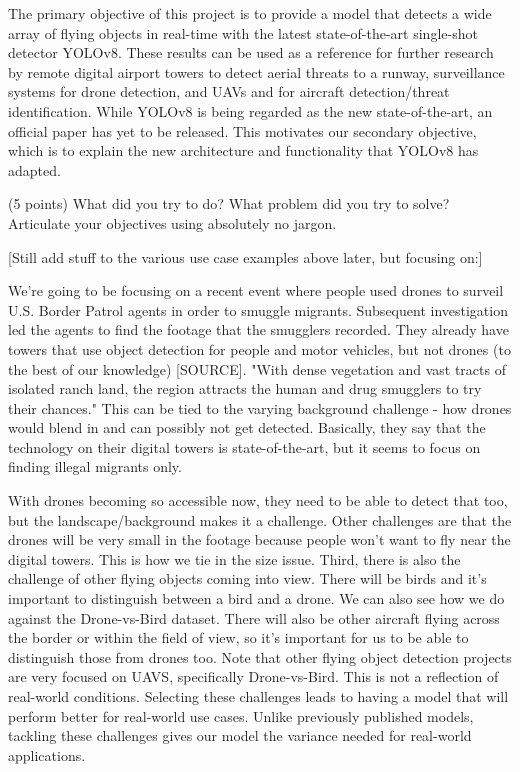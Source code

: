 \documentclass[10pt,twocolumn,letterpaper]{article}
\begin{document}
The primary objective of this project is to provide a model that detects a wide array of flying objects in real-time with the latest 
state-of-the-art single-shot detector YOLOv8. These results can be used as a reference for further research by remote digital airport 
towers to detect aerial threats to a runway, surveillance systems for drone detection, and UAVs and for aircraft detection/threat identification. 
While YOLOv8 is being regarded as the new state-of-the-art, an official paper has yet to be released. This motivates our secondary objective, 
which is to explain the new architecture and functionality that YOLOv8 has adapted.


(5 points) What did you try to do? What problem did you try to solve? Articulate your objectives using absolutely no jargon. 

[Still add stuff to the various use case examples above later, but focusing on:]
    
We're going to be focusing on a recent event where people used drones to surveil U.S. Border Patrol agents in order to smuggle migrants. Subsequent investigation led the agents to find the footage that the smugglers recorded. They already have towers that use object detection for people and motor vehicles, but not drones (to the best of our knowledge) [SOURCE]. "With dense vegetation and vast tracts of isolated ranch land, the region attracts the human and drug smugglers to try their chances." This can be tied to the varying background challenge - how drones would blend in and can possibly not get detected. Basically, they say that the technology on their digital towers is state-of-the-art, but it seems to focus on finding illegal migrants only. 

With drones becoming so accessible now, they need to be able to detect that too, but the landscape/background makes it a challenge. Other challenges are that the drones will be very small in the footage because people won't want to fly near the digital towers. This is how we tie in the size issue. Third, there is also the challenge of other flying objects coming into view. There will be birds and it's important to distinguish between a bird and a drone. We can also see how we do against the Drone-vs-Bird dataset. There will also be other aircraft flying across the border or within the field of view, so it's important for us to be able to distinguish those from drones too. Note that other flying object detection projects are very focused on UAVS, specifically Drone-vs-Bird. This is not a reflection of real-world conditions. Selecting these challenges leads to having a model that will perform better for real-world use cases. Unlike previously published models, tackling these challenges gives our model the variance needed for real-world applications.
\end{document}
